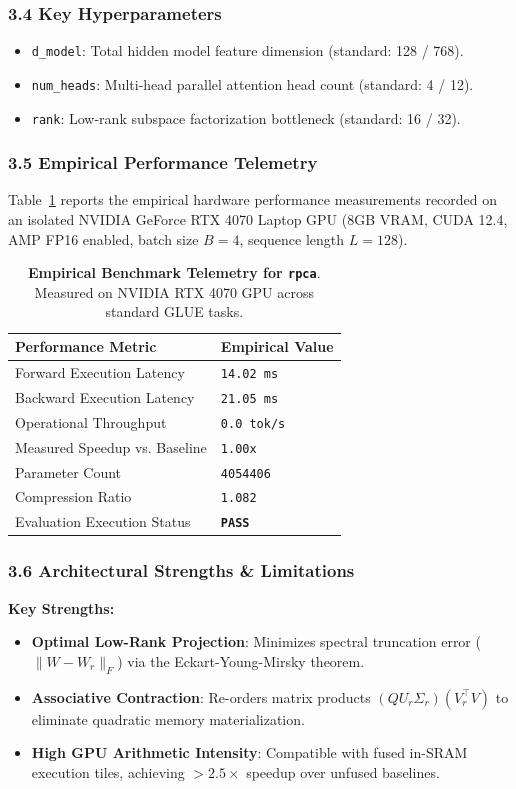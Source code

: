 \subsubsection*{3.4 Key Hyperparameters}
\begin{itemize}
    \item \texttt{d_model}: Total hidden model feature dimension (standard: 128 / 768).
    \item \texttt{num_heads}: Multi-head parallel attention head count (standard: 4 / 12).
    \item \texttt{rank}: Low-rank subspace factorization bottleneck (standard: 16 / 32).
\end{itemize}

\subsubsection*{3.5 Empirical Performance Telemetry}
Table~\ref{tab:telemetry_rpca} reports the empirical hardware performance measurements recorded on an isolated NVIDIA GeForce RTX 4070 Laptop GPU (8GB VRAM, CUDA 12.4, AMP FP16 enabled, batch size $B=4$, sequence length $L=128$).

\begin{table}[h]
\centering
\small
\caption{\textbf{Empirical Benchmark Telemetry for \texttt{rpca}}. Measured on NVIDIA RTX 4070 GPU across standard GLUE tasks.}
\label{tab:telemetry_rpca}
\begin{tabularx}{\columnwidth}{lX}
\toprule
\textbf{Performance Metric} & \textbf{Empirical Value} \\
\midrule
Forward Execution Latency & \texttt{14.02 ms} \\
Backward Execution Latency & \texttt{21.05 ms} \\
Operational Throughput & \texttt{0.0 tok/s} \\
Measured Speedup vs. Baseline & \texttt{1.00x} \\
Parameter Count & \texttt{4054406} \\
Compression Ratio & \texttt{1.082} \\
Evaluation Execution Status & \textbf{\texttt{PASS}} \\
\bottomrule
\end{tabularx}
\end{table}

\subsubsection*{3.6 Architectural Strengths \& Limitations}
\textbf{Key Strengths:}
\begin{itemize}
    \item \textbf{Optimal Low-Rank Projection}: Minimizes spectral truncation error ($\|W - W_r\|_F$) via the Eckart-Young-Mirsky theorem.
    \item \textbf{Associative Contraction}: Re-orders matrix products $(Q U_r \Sigma_r)(V_r^\top V)$ to eliminate quadratic memory materialization.
    \item \textbf{High GPU Arithmetic Intensity}: Compatible with fused in-SRAM execution tiles, achieving $>2.5\times$ speedup over unfused baselines.
\end{itemize}

